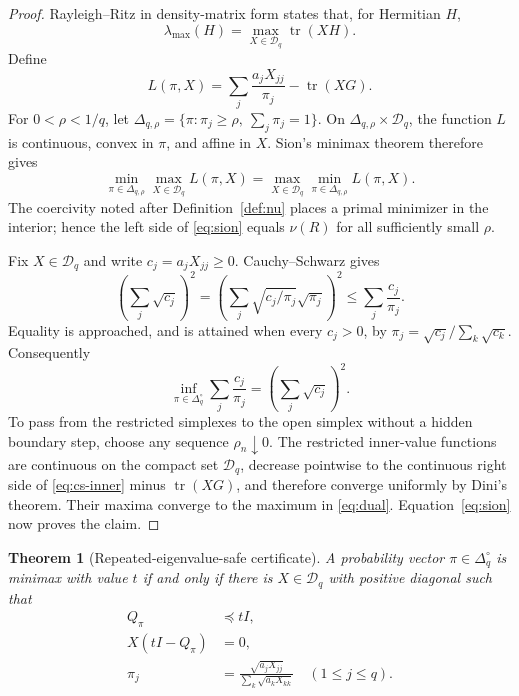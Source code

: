 \documentclass[11pt]{article}
\newtheorem{theorem}{Theorem}[section]
\theoremstyle{definition}
\newcommand{\D}{\mathcal D}
\newcommand{\tr}{\operatorname{tr}}
\begin{document}
\begin{proof}
Rayleigh--Ritz in density-matrix form states that, for Hermitian $H$,
\begin{equation}
  \lambda_{\max}(H)=\max_{X\in\D_q}\tr(XH).
  \label{eq:density-rayleigh}
\end{equation}
Define
\[
  L(\pi,X)=\sum_j\frac{a_jX_{jj}}{\pi_j}-\tr(XG).
\]
For $0<\rho<1/q$, let
$\Delta_{q,\rho}=\{\pi:\pi_j\ge\rho,\ \sum_j\pi_j=1\}$.  On
$\Delta_{q,\rho}\times\D_q$, the function $L$ is continuous, convex in $\pi$, and affine in
$X$.  Sion's minimax theorem therefore gives
\begin{equation}
  \min_{\pi\in\Delta_{q,\rho}}\max_{X\in\D_q}L(\pi,X)
  =\max_{X\in\D_q}\min_{\pi\in\Delta_{q,\rho}}L(\pi,X).
  \label{eq:sion}
\end{equation}
The coercivity noted after Definition~\ref{def:nu} places a primal minimizer in the interior;
hence the left side of \eqref{eq:sion} equals $\nu(R)$ for all sufficiently small $\rho$.

Fix $X\in\D_q$ and write $c_j=a_jX_{jj}\ge0$.  Cauchy--Schwarz gives
\[
  \left(\sum_j\sqrt{c_j}\right)^2
  =\left(\sum_j\sqrt{c_j/\pi_j}\sqrt{\pi_j}\right)^2
  \le\sum_j\frac{c_j}{\pi_j}.
\]
Equality is approached, and is attained when every $c_j>0$, by
$\pi_j=\sqrt{c_j}/\sum_k\sqrt{c_k}$.  Consequently
\begin{equation}
  \inf_{\pi\in\Delta_q^\circ}\sum_j\frac{c_j}{\pi_j}
  =\left(\sum_j\sqrt{c_j}\right)^2.
  \label{eq:cs-inner}
\end{equation}
To pass from the restricted simplexes to the open simplex without a hidden boundary step, choose
any sequence $\rho_n\downarrow0$.  The restricted inner-value functions are continuous on the
compact set $\D_q$, decrease pointwise to the continuous right side of
\eqref{eq:cs-inner} minus $\tr(XG)$, and therefore converge uniformly by Dini's theorem.  Their
maxima converge to the maximum in \eqref{eq:dual}.  Equation~\eqref{eq:sion} now proves the
claim.
\end{proof}

\begin{theorem}[Repeated-eigenvalue-safe certificate]
\label{thm:certificate}
A probability vector $\pi\in\Delta_q^\circ$ is minimax with value $t$ if and only if there is
$X\in\D_q$ with positive diagonal such that
\begin{align}
  Q_\pi&\preceq tI,                                      \label{eq:cert-upper}\\
  X(tI-Q_\pi)&=0,                                        \label{eq:cert-support}\\
  \pi_j&=\frac{\sqrt{a_jX_{jj}}}
  {\sum_k\sqrt{a_kX_{kk}}}\quad(1\le j\le q).           \label{eq:cert-law}
\end{align}
\end{theorem}
\end{document}
